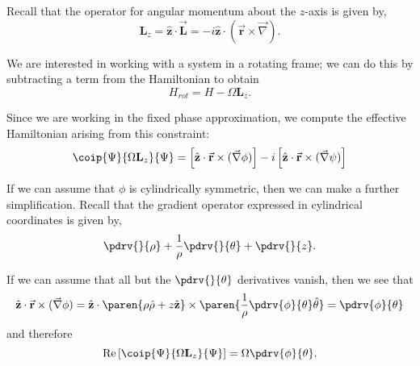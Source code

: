 \documentclass[onecolumn,,amsmath,amssymb,nofootinbib,floatfix]{revtex4}
\begin{document}
Recall that the operator for angular momentum about the $z$-axis is given by,
$$\textbf{L}_z = \hat{\textbf{z}}\cdot \vec{\textbf{L}} = -i\hat{\textbf{z}}\cdot (\vec{\textbf{r}}\times\vec{\nabla}).$$

We are interested in working with a system in a rotating frame;  we can do this by subtracting a term from the Hamiltonian to obtain
$$H_{rot} = H - \Omega \textbf{L}_z.$$

Since we are working in the fixed phase approximation, we compute the effective Hamiltonian arising from this constraint:
$$\coip{\Psi}{\Omega \textbf{L}_z}{\Psi} = \left[\hat{\textbf{z}}\cdot\vec{\textbf{r}}\times(\vec{\nabla}\phi)\right]-i\left[\hat{\textbf{z}}\cdot\vec{\textbf{r}}\times(\vec{\nabla}\psi)\right]$$

If we can assume that $\phi$ is cylindrically symmetric, then we can make a further simplification.  Recall that the gradient operator expressed in cylindrical coordinates is given by,
$$\pdrv{}{\rho} + \frac{1}{\rho}\pdrv{}{\theta} + \pdrv{}{z}.$$

If we can assume that all but the $\pdrv{}{\theta}$ derivatives vanish, then we see that
$$
\begin{aligned}
\hat{\textbf{z}}\cdot\vec{\textbf{r}}\times(\vec{\nabla}\phi)
= \hat{\textbf{z}}\cdot\paren{\rho \hat{\rho} + z\hat{\textbf{z}}}\times\paren{\frac{1}{\rho}\pdrv{\phi}{\theta}\hat\theta}
= \pdrv{\phi}{\theta}\\ 
\end{aligned}
$$
and therefore
$$\text{Re}\left[\coip{\Psi}{\Omega \textbf{L}_z}{\Psi}\right] = \Omega\pdrv{\phi}{\theta}.$$
\end{document}
